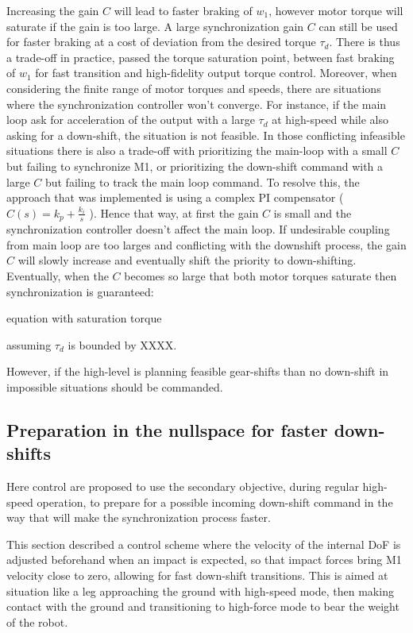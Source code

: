 Increasing the gain $C$ will lead to faster braking of $w_1$, however motor torque will saturate if the gain is too large. A large synchronization gain $C$ can still be used for faster braking at a cost of deviation from the desired torque $\tau_d$. There is thus a trade-off in practice, passed the torque saturation point, between fast braking of $w_1$ for fast transition and high-fidelity output torque control. Moreover, when considering the finite range of motor torques and speeds, there are situations where the synchronization controller won't converge. For instance, if the main loop ask for acceleration of the output with a large $\tau_d$ at high-speed while also asking for a down-shift, the situation is not feasible. In those conflicting infeasible situations there is also a trade-off with prioritizing the main-loop with a small $C$ but failing to synchronize M1, or prioritizing the down-shift command with a large $C$ but failing to track the main loop command. To resolve this, the approach that was implemented is using a complex PI compensator ( $C(s) = k_p + \frac{k_i}{s}$ ). Hence that way, at first the gain $C$ is small and the synchronization controller doesn't affect the main loop. If undesirable coupling from main loop are too larges and conflicting with the downshift process, the gain $C$ will slowly increase and eventually shift the priority to down-shifting. Eventually, when the $C$ becomes so large that both motor torques saturate then synchronization is guaranteed:

equation with saturation torque

assuming $\tau_d$ is bounded by XXXX.


However, if the high-level is planning feasible gear-shifts than no down-shift in impossible situations should be commanded. 

\subsection{Preparation in the nullspace for faster down-shifts}
\label{sec:prep}


Here control are proposed to use the secondary objective, during regular high-speed operation, to prepare for a possible incoming down-shift command in the way that will make the synchronization process faster. 

This section described a control scheme where the velocity of the internal DoF is adjusted beforehand when an impact is expected, so that impact forces bring M1 velocity close to zero, allowing for fast down-shift transitions. This is aimed at situation like a leg approaching the ground with high-speed mode, then making contact with the ground and transitioning to high-force mode to bear the weight of the robot.



